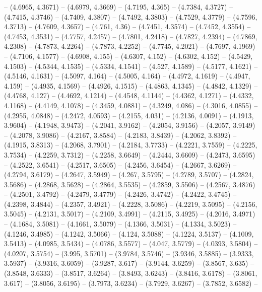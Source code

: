 {  -- (4.6965, 4.3671) -- (4.6979, 4.3669) -- (4.7195, 4.365) -- (4.7384, 4.3727)
   -- (4.7415, 4.3746) -- (4.7409, 4.3807) -- (4.7492, 4.3803) -- (4.7529, 
  4.3779) -- (4.7596, 4.3713) -- (4.7609, 4.3657) -- (4.761, 4.36) -- (4.7451, 
  4.3574) -- (4.7452, 4.3554) -- (4.7453, 4.3531) -- (4.7757, 4.2457) -- 
  (4.7801, 4.2418) -- (4.7827, 4.2394) -- (4.7869, 4.2308) -- (4.7873, 4.2264) 
  -- (4.7873, 4.2252) -- (4.7745, 4.2021) -- (4.7697, 4.1969) -- (4.7106, 
  4.1577) -- (4.6908, 4.155) -- (4.6307, 4.152) -- (4.6302, 4.152) -- (4.5429, 
  4.1503) -- (4.5344, 4.1535) -- (4.5334, 4.1541) -- (4.527, 4.1589) -- (4.5177,
   4.1621) -- (4.5146, 4.1631) -- (4.5097, 4.164) -- (4.5005, 4.164) -- (4.4972,
   4.1619) -- (4.4947, 4.159) -- (4.4935, 4.1569) -- (4.4926, 4.1515) -- 
  (4.4863, 4.1345) -- (4.4842, 4.1329) -- (4.4768, 4.127) -- (4.4692, 4.1214) --
   (4.4548, 4.1144) -- (4.4362, 4.1271) -- (4.4332, 4.1168) -- (4.4149, 4.1078) 
  -- (4.3459, 4.0881) -- (4.3249, 4.086) -- (4.3016, 4.0855) -- (4.2955, 4.0848)
   -- (4.2472, 4.0593) -- (4.2155, 4.031) -- (4.2136, 4.0091) -- (4.1913, 
  3.9604) -- (4.1948, 3.9473) -- (4.2041, 3.9162) -- (4.2054, 3.9156) -- 
  (4.2057, 3.9149) -- (4.2078, 3.9086) -- (4.2167, 3.8584) -- (4.2183, 3.8439) 
  -- (4.2062, 3.8392) -- (4.1915, 3.8313) -- (4.2068, 3.7901) -- (4.2184, 
  3.7733) -- (4.2221, 3.7559) -- (4.2225, 3.7534) -- (4.2259, 3.7312) -- 
  (4.2258, 3.6649) -- (4.2444, 3.6609) -- (4.2473, 3.6595) -- (4.2522, 3.6541) 
  -- (4.2517, 3.6505) -- (4.2456, 3.6454) -- (4.2667, 3.6269) -- (4.2794, 
  3.6179) -- (4.2647, 3.5949) -- (4.267, 3.5795) -- (4.2789, 3.5707) -- (4.2824,
   3.5686) -- (4.2868, 3.5628) -- (4.2864, 3.5535) -- (4.2859, 3.5506) -- 
  (4.2567, 3.4876) -- (4.2501, 3.4792) -- (4.2479, 3.4779) -- (4.2426, 3.4742) 
  -- (4.2422, 3.4745) -- (4.2398, 3.4844) -- (4.2357, 3.4921) -- (4.2228, 
  3.5086) -- (4.2219, 3.5095) -- (4.2156, 3.5045) -- (4.2131, 3.5017) -- 
  (4.2109, 3.4991) -- (4.2115, 3.4925) -- (4.2016, 3.4971) -- (4.1684, 3.5081) 
  -- (4.1661, 3.5079) -- (4.1366, 3.5031) -- (4.1334, 3.5023) -- (4.1246, 
  3.4985) -- (4.1242, 3.5066) -- (4.124, 3.5088) -- (4.1224, 3.5137) -- (4.1009,
   3.5413) -- (4.0985, 3.5434) -- (4.0786, 3.5577) -- (4.047, 3.5779) -- 
  (4.0393, 3.5804) -- (4.0207, 3.5754) -- (3.995, 3.5701) -- (3.9784, 3.5746) --
   (3.9346, 3.5885) -- (3.9333, 3.5937) -- (3.9316, 3.6059) -- (3.9287, 3.617) 
  -- (3.9144, 3.6259) -- (3.8567, 3.635) -- (3.8548, 3.6333) -- (3.8517, 3.6264)
   -- (3.8493, 3.6243) -- (3.8416, 3.6178) -- (3.8061, 3.617) -- (3.8056, 
  3.6195) -- (3.7973, 3.6234) -- (3.7929, 3.6267) -- (3.7852, 3.6582) -- 
}
